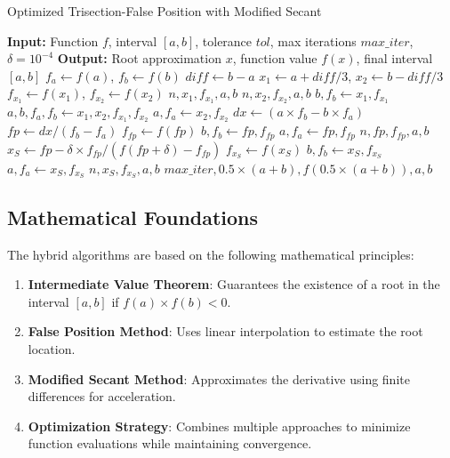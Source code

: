 \documentclass[reprint, amsmath, amssymb, aps, prl]{revtex4-2}
\begin{document}
\vspace{1em}
\begin{algorithm}[h!]
\caption{Optimized Trisection-False Position with Modified Secant}
\begin{algorithmic}[1]
\State \textbf{Input:} Function $f$, interval $[a, b]$, tolerance $tol$, max iterations $max\_iter$, $\delta = 10^{-4}$
\State \textbf{Output:} Root approximation $x$, function value $f(x)$, final interval $[a, b]$
\State $f_a \gets f(a)$, $f_b \gets f(b)$
    \State $diff \gets b - a$
    \State $x_1 \gets a + diff/3$, $x_2 \gets b - diff/3$
    \State $f_{x_1} \gets f(x_1)$, $f_{x_2} \gets f(x_2)$
        \State \Return $n, x_1, f_{x_1}, a, b$
    \EndIf
        \State \Return $n, x_2, f_{x_2}, a, b$
    \EndIf
        \State $b, f_b \gets x_1, f_{x_1}$
        \State $a, b, f_a, f_b \gets x_1, x_2, f_{x_1}, f_{x_2}$
    \Else
        \State $a, f_a \gets x_2, f_{x_2}$
    \EndIf
    \State $dx \gets (a \times f_b - b \times f_a)$
    \State $fp \gets dx / (f_b - f_a)$
    \State $f_{fp} \gets f(fp)$
        \State $b, f_b \gets fp, f_{fp}$
    \Else
        \State $a, f_a \gets fp, f_{fp}$
    \EndIf
        \State \Return $n, fp, f_{fp}, a, b$
    \EndIf
    \State $x_S \gets fp - \delta \times f_{fp} / (f(fp + \delta) - f_{fp})$
        \State $f_{x_S} \gets f(x_S)$
                \State $b, f_b \gets x_S, f_{x_S}$
            \Else
                \State $a, f_a \gets x_S, f_{x_S}$
            \EndIf
                \State \Return $n, x_S, f_{x_S}, a, b$
            \EndIf
        \EndIf
    \EndIf
\EndFor
\State \Return $max\_iter, 0.5 \times (a + b), f(0.5 \times (a + b)), a, b$
\end{algorithmic}
\end{algorithm}
\vspace{1em}

\subsection{Mathematical Foundations}

The hybrid algorithms are based on the following mathematical principles:

\begin{enumerate}
    \item \textbf{Intermediate Value Theorem}: Guarantees the existence of a root in the interval $[a,b]$ if $f(a) \times f(b) < 0$.
    \item \textbf{False Position Method}: Uses linear interpolation to estimate the root location.
    \item \textbf{Modified Secant Method}: Approximates the derivative using finite differences for acceleration.
    \item \textbf{Optimization Strategy}: Combines multiple approaches to minimize function evaluations while maintaining convergence.
\end{enumerate}
\end{document}
